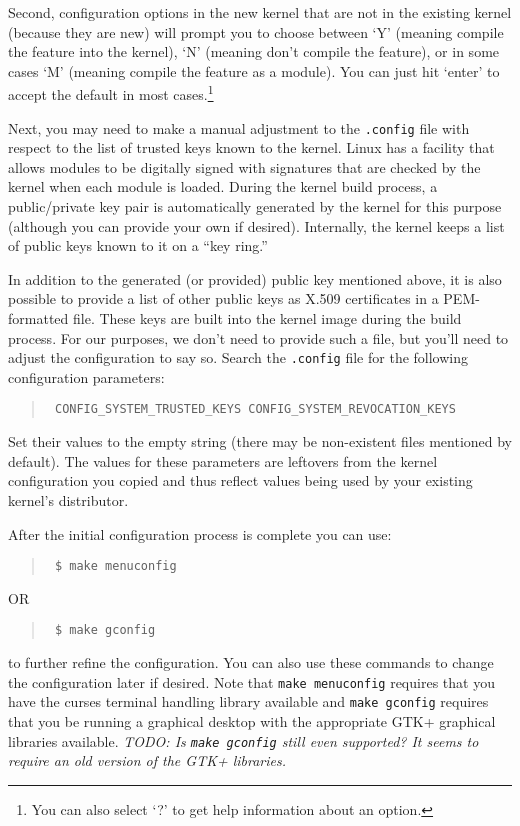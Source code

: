 \documentclass{article}
\newcommand{\command}[1]{\texttt{#1}}
\newcommand{\filename}[1]{\texttt{#1}}
\newcommand{\todo}[1]{\textit{TODO: #1}}
\newenvironment{commands}
  {\begin{quote} \tt}
  {\end{quote}}
\begin{document}
Second, configuration options in the new kernel that are not in the existing kernel (because
they are new) will prompt you to choose between `Y' (meaning compile the feature into the
kernel), `N' (meaning don't compile the feature), or in some cases `M' (meaning compile the
feature as a module). You can just hit `enter' to accept the default in most cases.\footnote{You
can also select `?' to get help information about an option.}

Next, you may need to make a manual adjustment to the \filename{.config} file with respect to
the list of trusted keys known to the kernel. Linux has a facility that allows modules to be
digitally signed with signatures that are checked by the kernel when each module is loaded.
During the kernel build process, a public/private key pair is automatically generated by the
kernel for this purpose (although you can provide your own if desired). Internally, the kernel
keeps a list of public keys known to it on a ``key ring.''

In addition to the generated (or provided) public key mentioned above, it is also possible to
provide a list of other public keys as X.509 certificates in a PEM-formatted file. These keys
are built into the kernel image during the build process. For our purposes, we don't need to
provide such a file, but you'll need to adjust the configuration to say so. Search the
\filename{.config} file for the following configuration parameters:

\begin{commands}
  CONFIG\_SYSTEM\_TRUSTED\_KEYS
  CONFIG\_SYSTEM\_REVOCATION\_KEYS
\end{commands}

Set their values to the empty string (there may be non-existent files mentioned by default). The
values for these parameters are leftovers from the kernel configuration you copied and thus
reflect values being used by your existing kernel's distributor.

After the initial configuration process is complete you can use:
\begin{commands}
\$ make menuconfig
\end{commands}
OR
\begin{commands}
\$ make gconfig
\end{commands}

to further refine the configuration. You can also use these commands to change the configuration
later if desired. Note that \command{make menuconfig} requires that you have the curses terminal
handling library available and \command{make gconfig} requires that you be running a graphical
desktop with the appropriate GTK+ graphical libraries available. \todo{Is \texttt{make gconfig}
still even supported? It seems to require an old version of the GTK+ libraries.}
\end{document}
